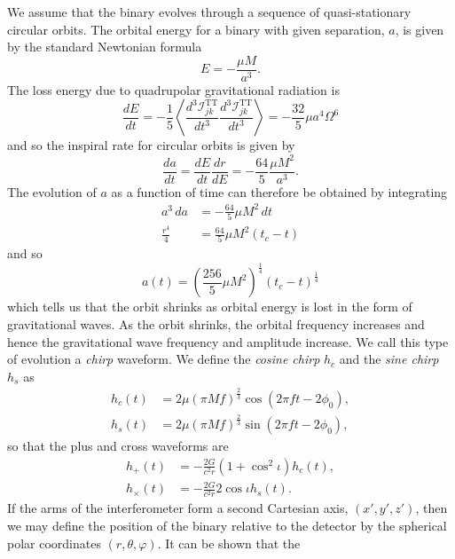 We assume that the binary evolves through a sequence of quasi-stationary
circular orbits. The orbital energy for a binary with given separation, $a$,
is given by the standard Newtonian formula
\begin{equation}
E = -\frac{\mu M}{a^3}.
\end{equation}
The loss energy due to quadrupolar gravitational radiation is\cite{MTW73}
\begin{equation}
\frac{dE}{dt} = - \frac{1}{5} \left\langle 
\frac{d^3 \mathcal{I}^\mathrm{TT}_{jk}}{dt^3}
\frac{d^3 \mathcal{I}^\mathrm{TT}_{jk}}{dt^3}
\right\rangle = - \frac{32}{5}\mu a^4 \Omega^6
\end{equation}
and so the inspiral rate for circular orbits is given by
\begin{equation}
\frac{da}{dt} = \frac{dE}{dt}\frac{dr}{dE} = - \frac{64}{5}\frac{\mu
M^2}{a^3}.
\end{equation}
The evolution of $a$ as a function of time can therefore be obtained by
integrating
\begin{align}
a^3 \, da &= - \frac{64}{5} \mu M^2 \, dt \\
\frac{r^4}{4} &= \frac{64}{5} \mu M^2 (t_c - t)
\end{align}
and so
\begin{equation}
a(t) = \left(\frac{256}{5} \mu M^2 \right)^{\frac{1}{4}}
       \left(t_c - t\right)^{\frac{1}{4}}
\label{eq:aoft}
\end{equation}
which tells us that the orbit shrinks as orbital energy is lost in the form of
gravitational waves. As the orbit shrinks, the orbital frequency increases and
hence the gravitational wave frequency and amplitude increase. We call this
type of evolution a \emph{chirp} waveform. We define the \emph{cosine chirp}
$h_c$  and the \emph{sine chirp} $h_s$ as 
\begin{align}
h_c(t) & = 2\mu (\pi M f)^{\frac{2}{3}} \cos(2\pi f t - 2\phi_0), \\
h_s(t) & = 2\mu (\pi M f)^{\frac{2}{3}} \sin(2\pi f t - 2\phi_0),
\end{align}
so that the plus and cross waveforms are
\begin{align}
h_+(t) &= - \frac{2G}{c^2 r} (1 + \cos^2\iota) h_c(t), \\
h_\times(t) &= - \frac{2G}{c^2 r} 2\cos\iota h_s(t).
\end{align}
If the arms of the interferometer form a second Cartesian axis, $(x',y',z')$,
then we may define the position of the binary relative to the detector by the
spherical polar coordinates $(r,\theta,\varphi)$. It can be shown that the
